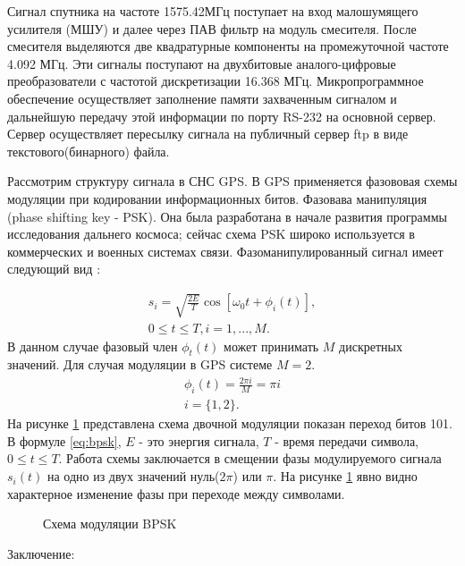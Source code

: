 \documentclass[a4paper,12pt]{article}
\numberwithin{table}{section}
\begin{document}
Сигнал спутника на частоте 1575.42МГц поступает на вход малошумящего усилителя (МШУ) и далее через ПАВ фильтр на модуль смесителя.
После смесителя выделяются две квадратурные компоненты на промежуточной частоте 4.092 МГц.
Эти сигналы поступают на двухбитовые аналого-цифровые преобразователи с частотой дискретизации 16.368 МГц.
Микропрограммное обеспечение осуществляет заполнение памяти захваченным сигналом и дальнейшую передачу этой информации
по порту RS-232 на основной сервер. Сервер осуществляет пересылку сигнала на публичный сервер ftp в виде текстового(бинарного) файла.

Рассмотрим структуру сигнала в СНС GPS. В GPS применяется фазововая схемы модуляции при кодировании информационных битов.
Фазовава манипуляция (phase shifting key - PSK).  Она была разработана  в начале развития программы исследования дальнего космоса;
сейчас схема PSK широко используется в коммерческих и военных системах связи. Фазоманипулированный сигнал имеет следующий вид \cite{sklyar}:

\begin{eqnarray}
s_i=\sqrt{\frac{2E}{T}}\cos{[{{\omega}_0}t + \phi_i(t)]}, \nonumber \\
	0\leq{t}\leq{T}, i = 1, ..., M.
\label{eq:bpsk}
\end{eqnarray}
В данном случае фазовый член ${\phi_t(t)}$ может принимать ${M}$ дискретных значений. Для случая модуляции в GPS системе ${M=2}$.
\begin{eqnarray}
	\phi_i(t)=\frac{2\pi{i}}{M}=\pi{i} \nonumber \\
	i = \{1,2\}.
\label{eq:bpsk_phi}
\end{eqnarray}
На рисунке \ref{pic:bpsk} представлена схема двочной модуляции показан переход битов 101. В формуле \ref{eq:bpsk}, ${E}$ - это энергия
сигнала, ${T}$ - время передачи символа, ${0\leq{t}\leq{T}}$. Работа схемы заключается в смещении фазы модулируемого сигнала
${s_i(t)}$ на одно из двух значений нуль(${2\pi}$) или ${\pi}$. На рисунке \ref{pic:bpsk} явно видно характерное изменение фазы при 
переходе между символами.

\begin{figure}[h]
\begin{center}
\end{center}
\caption{Схема модуляции BPSK}
\label{pic:bpsk}
\end{figure}

Заключение:


\end{document}
